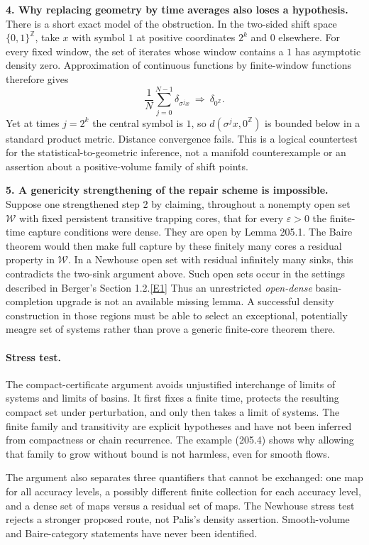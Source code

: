\documentclass[11pt,a4paper]{article}
\newcommand{\Z}{\mathbb{Z}}
\newcommand{\eref}[2]{\hyperlink{extra:#1:#2}{[E#2]}}
\begin{document}
\textbf{4. Why replacing geometry by time averages also loses a hypothesis.}
There is a short exact model of the obstruction. In the two-sided shift
space $\{0,1\}^{\Z}$, take $x$ with symbol $1$ at positive coordinates
$2^k$ and $0$ elsewhere. For every fixed window, the set of iterates
whose window contains a $1$ has asymptotic density zero. Approximation
of continuous functions by finite-window functions therefore gives
\[
 \frac1N\sum_{j=0}^{N-1}\delta_{\sigma^j x}
 \ \Longrightarrow\ \delta_{0^{\Z}}.
\]
Yet at times $j=2^k$ the central symbol is $1$, so
$d(\sigma^j x,0^{\Z})$ is bounded below in a standard product metric.
Distance convergence fails. This is a logical countertest for the
statistical-to-geometric inference, not a manifold counterexample or
an assertion about a positive-volume family of shift points.

\textbf{5. A genericity strengthening of the repair scheme is impossible.}
Suppose one strengthened step 2 by claiming, throughout a nonempty open
set $\mathcal W$ with fixed persistent transitive trapping cores, that
for every $\varepsilon>0$ the finite-time capture conditions were dense.
They are open by Lemma 205.1. The Baire theorem would then make full
capture by these finitely many cores a residual property in
$\mathcal W$. In a Newhouse open set with residual infinitely many sinks,
this contradicts the two-sink argument above. Such open sets occur in
the settings described in Berger's Section 1.2.\eref{statement}{1}
Thus an unrestricted \emph{open-dense} basin-completion upgrade is not
an available missing lemma. A successful density construction in those
regions must be able to select an exceptional, potentially meagre set
of systems rather than prove a generic finite-core theorem there.

\paragraph{Stress test.}
The compact-certificate argument avoids unjustified interchange of
limits of systems and limits of basins. It first fixes a finite time,
protects the resulting compact set under perturbation, and only then
takes a limit of systems. The finite family and transitivity are explicit
hypotheses and have not been inferred from compactness or chain
recurrence. The example (205.4) shows why allowing that family to grow
without bound is not harmless, even for smooth flows.

The argument also separates three quantifiers that cannot be exchanged:
one map for all accuracy levels, a possibly different finite collection
for each accuracy level, and a dense set of maps versus a residual set
of maps. The Newhouse stress test rejects a stronger proposed route,
not Palis's density assertion. Smooth-volume and Baire-category
statements have never been identified.
\end{document}
